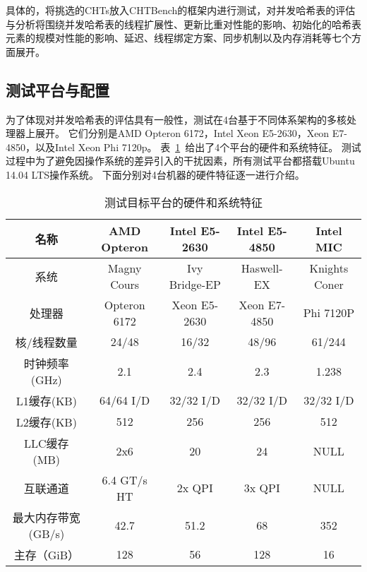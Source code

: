 具体的，将挑选的CHTs放入CHTBench的框架内进行测试，对并发哈希表的评估与分析将围绕并发哈希表的线程扩展性、更新比重对性能的影响、初始化的哈希表元素的规模对性能的影响、延迟、线程绑定方案、同步机制以及内存消耗等七个方面展开。

\subsection{测试平台与配置}
为了体现对并发哈希表的评估具有一般性，测试在4台基于不同体系架构的多核处理器上展开。
它们分别是AMD Opteron 6172，Intel Xeon E5-2630，Xeon E7-4850，以及Intel Xeon Phi 7120p。
表~\ref{tab:arch_info}~给出了4个平台的硬件和系统特征。
测试过程中为了避免因操作系统的差异引入的干扰因素，所有测试平台都搭载Ubuntu 14.04 LTS操作系统。
下面分别对4台机器的硬件特征逐一进行介绍。

\begin{table}[htbp]
  \centering
  \caption{测试目标平台的硬件和系统特征}
  \label{tab:arch_info}
  \begin{tabular}{ccccc}
    \toprule
       名称             & AMD Opteron           & Intel E5-2630       & Intel E5-4850     & Intel MIC \\
    \midrule
      系统               & Magny Cours      &  Ivy Bridge-EP        &  Haswell-EX         &  Knights Coner \\
      处理器             &  Opteron 6172         &  Xeon E5-2630      & Xeon E7-4850     &  Phi 7120P \\
      核/线程数量         & 24/48                & 16/32                & 48/96              & 61/244 \\
      时钟频率(GHz)       & 2.1                  & 2.4                  & 2.3               & 1.238 \\
      L1缓存(KB)         & 64/64 I/D             & 32/32 I/D            & 32/32 I/D         & 32/32 I/D \\
      L2缓存(KB)         & 512                  & 256                   & 256               & 512 \\
      LLC缓存(MB)        & 2x6                  & 20                    & 24                & NULL \\
      互联通道            & 6.4 GT/s HT          & 2x QPI               & 3x QPI             & NULL \\
      最大内存带宽(GB/s)   & 42.7                 & 51.2                 & 68                & 352   \\
      主存（GiB）         & 128                   & 56                  & 128                & 16 \\
    \bottomrule
  \end{tabular}
\end{table}


